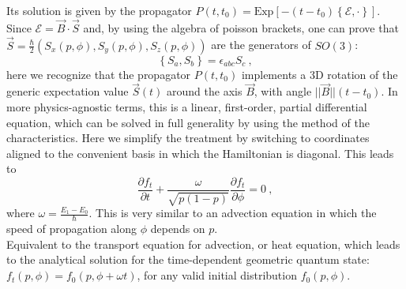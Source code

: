 \documentclass[draft,nofootinbib,pre,twocolumn,showpacs,showkeys,preprintnumbers,floatfix]{revtex4-1}
\newcommand{\1}{\mathbbm{1}}
\begin{document}
Its solution is given by the propagator $P(t,t_0) = \mathrm{Exp}\left[ - (t-t_0)\left\{\mathcal{E}, \cdot \right\} \right]$.
Since $\mathcal{E}= \vec{B} \cdot \vec{S}$ and, by using the algebra of poisson brackets,
one can prove that $\vec{S} = \frac{\hbar}{2}\left( S_x(p,\phi),S_y(p,\phi),S_z(p,\phi)\right)$ are the generators of $SO(3)$:
\begin{equation}
\left\{ S_a, S_b\right\} = \epsilon_{abc} S_c~,
\end{equation}
 here we recognize that the propagator $P(t,t_0)$ implements a 3D rotation of the generic 
expectation value $\vec{S}(t)$ around the axis $\vec{B}$, with angle $||\vec{B}||(t - t_0)$. 
In more physics-agnostic terms, this is a linear, first-order, partial differential equation, which can be solved 
in full generality by using the method of the characteristics. Here we simplify the treatment 
by switching to coordinates aligned to the convenient basis in which the Hamiltonian 
is diagonal. This leads to
\begin{equation}
\frac{\partial f_t}{\partial t} + \frac{\omega}{\sqrt{p(1-p)}} \frac{\partial f_t}{\partial \phi} = 0~,
\end{equation}
where $\omega = \frac{E_1 - E_0}{\hbar}$. This is very similar to an advection equation in which the speed of 
propagation along $\phi$ depends on $p$. \\

Equivalent to the transport 
equation for advection, or heat equation, which leads to the analytical solution for the 
time-dependent geometric quantum state: $f_t(p,\phi) = f_0(p,\phi+\omega t)$, for any 
valid initial distribution $f_0(p,\phi)$.
\end{document}
